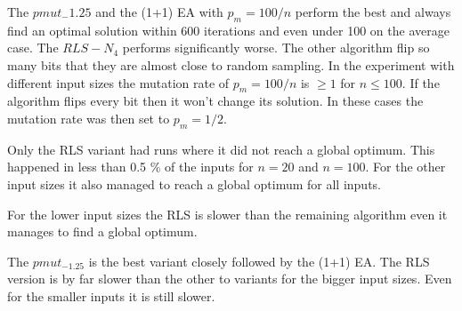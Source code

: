 

The $pmut_-1.25$ and the (1+1) EA with $p_m=100/n$ perform the best and always find an optimal solution within 600 iterations and even under 100 on the average case.
The $RLS-N_4$ performs significantly worse.
The other algorithm flip so many bits that they are almost close to random sampling.
In the experiment with different input sizes the mutation rate of $p_m=100/n$ is $\ge1$ for $n\le100$.
If the algorithm flips every bit then it won't change its solution.
In these cases the mutation rate was then set to $p_m=1/2$.



Only the RLS variant had runs where it did not reach a global optimum.
This happened in less than 0.5 \% of the inputs for $n=20$ and $n=100$.
For the other input sizes it also managed to reach a global optimum for all inputs.



For the lower input sizes the RLS is slower than the remaining algorithm even it manages to find a global optimum.



The $pmut_{-1.25}$ is the best variant closely followed by the (1+1) EA.
The RLS version is by far slower than the other to variants for the bigger input sizes.
Even for the smaller inputs it is still slower.
